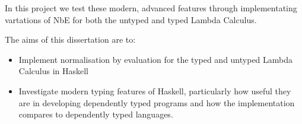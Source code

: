 In this project we test these modern, advanced features through implementating vartations of NbE for both the untyped and typed Lambda Calculus. 

The aims of this dissertation are to:
\begin{itemize}
    \item Implement normalisation by evaluation for the typed and untyped Lambda Calculus in Haskell
    
    \item Investigate modern typing features of Haskell, particularly how useful they are in developing dependently typed programs and how the implementation compares to dependently typed languages.
\end{itemize}
